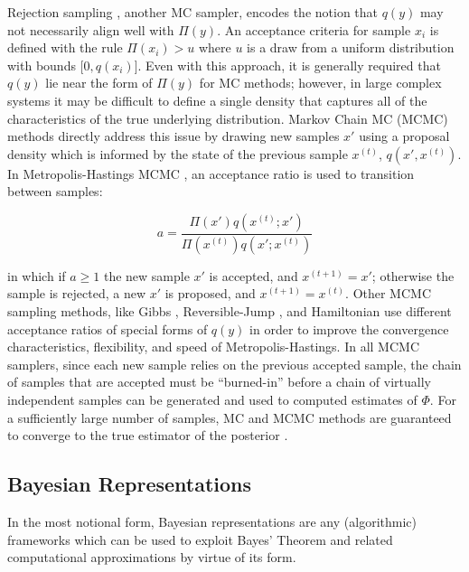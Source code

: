 Rejection sampling \autocite{mackay1998introduction}, another MC sampler, encodes the notion that $q(y)$ may not necessarily align well with $\Pi(y)$. An acceptance criteria for sample $x_i$ is defined with the rule $\Pi(x_i) > u$ where $u$ is a draw from a uniform distribution with bounds [$0, q(x_i)$]. Even with this approach, it is generally required that $q(y)$ lie near the form of $\Pi(y)$ for MC methods; however, in large complex systems it may be difficult to define a single density that captures all of the characteristics of the true underlying distribution. Markov Chain MC (MCMC) methods directly address this issue by drawing new samples $x'$ using a proposal density which is informed by the state of the previous sample $x^{(t)}$, $q(x',x^{(t)})$. In Metropolis-Hastings MCMC \autocite{liu1996metropolized,metropolis1953equation}, an acceptance ratio is used to transition between samples:

\begin{equation}
    a = \frac{\Pi(x')q(x^{(t)}; x')}{\Pi(x^{(t)})q(x'; x^{(t)})}
\end{equation}

\noindent in which if $a \geq 1$ the new sample $x'$ is accepted, and $x^{(t+1)} = x'$; otherwise the sample is rejected, a new $x'$ is proposed, and $x^{(t+1)} = x^{(t)}$. Other MCMC sampling methods, like Gibbs \autocite{mackay1998introduction}, Reversible-Jump \autocite{green1995reversible}, and Hamiltonian \autocite{neal2011mcmc} use different acceptance ratios of special forms of $q(y)$ in order to improve the convergence characteristics, flexibility, and speed of Metropolis-Hastings.
In all MCMC samplers, since each new sample relies on the previous accepted sample, the chain of samples that are accepted must be ``burned-in'' before a chain of virtually independent samples can be generated and used to computed estimates of $\Phi$. For a sufficiently large number of samples, MC and MCMC methods are guaranteed to converge to the true estimator of the posterior \autocite{mackay1998introduction}.


\subsection{Bayesian Representations}
In the most notional form, Bayesian representations are any (algorithmic) frameworks which can be used to exploit Bayes' Theorem and related computational approximations by virtue of its form.

